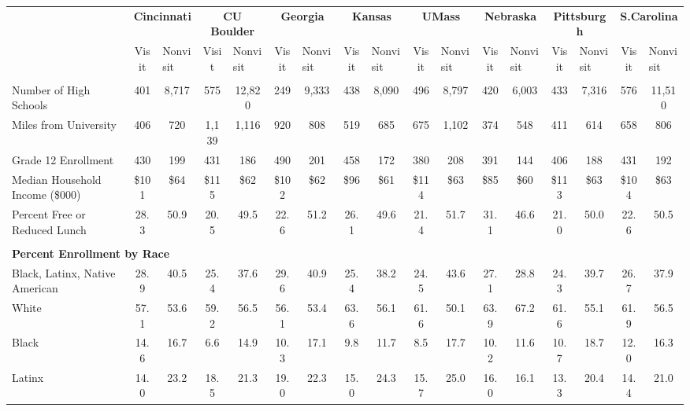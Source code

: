 \begin{tabular*}{\linewidth}{@{\extracolsep{\fill} } lcccccccccccccccc}%
&\multicolumn{2}{c}{\bfseries Cincinnati}&\multicolumn{2}{c}{\bfseries CU Boulder}&\multicolumn{2}{c}{\bfseries Georgia}&\multicolumn{2}{c}{\bfseries Kansas}&\multicolumn{2}{c}{\bfseries UMass}&\multicolumn{2}{c}{\bfseries Nebraska}&\multicolumn{2}{c}{\bfseries Pittsburgh}&\multicolumn{2}{c}{\bfseries S.Carolina}\\%
&Visit&\multicolumn{1}{l}{Nonvisit}&Visit&\multicolumn{1}{l}{Nonvisit}&Visit&\multicolumn{1}{l}{Nonvisit}&Visit&\multicolumn{1}{l}{Nonvisit}&Visit&\multicolumn{1}{l}{Nonvisit}&Visit&\multicolumn{1}{l}{Nonvisit}&Visit&\multicolumn{1}{l}{Nonvisit}&Visit&\multicolumn{1}{l}{Nonvisit}\\%
\hline%
&&&&&&&&&&&&&&&&\\%
\hspace{0cm}Number of High Schools&401&8,717&575&12,820&249&9,333&438&8,090&496&8,797&420&6,003&433&7,316&576&11,510\\%
\hspace{0cm}Miles from University&406&720&1,139&1,116&920&808&519&685&675&1,102&374&548&411&614&658&806\\%
\hspace{0cm}Grade 12 Enrollment&430&199&431&186&490&201&458&172&380&208&391&144&406&188&431&192\\%
\hspace{0cm}Median Household Income (\$000)&\$101&\$64&\$115&\$62&\$102&\$62&\$96&\$61&\$114&\$63&\$85&\$60&\$113&\$63&\$104&\$63\\%
\hspace{0cm}Percent Free or Reduced Lunch&28.3&50.9&20.5&49.5&22.6&51.2&26.1&49.6&21.4&51.7&31.1&46.6&21.0&50.0&22.6&50.5\\%
&&&&&&&&&&&&&&&&\\%
\multicolumn{17}{l}{\bfseries Percent Enrollment by Race}\\%
\hspace{0.2cm}Black, Latinx, Native American&28.9&40.5&25.4&37.6&29.6&40.9&25.4&38.2&24.5&43.6&27.1&28.8&24.3&39.7&26.7&37.9\\%
\hspace{0.2cm}White&57.1&53.6&59.2&56.5&56.1&53.4&63.6&56.1&61.6&50.1&63.9&67.2&61.6&55.1&61.9&56.5\\%
\hspace{0.2cm}Black&14.6&16.7&6.6&14.9&10.3&17.1&9.8&11.7&8.5&17.7&10.2&11.6&10.7&18.7&12.0&16.3\\%
\hspace{0.2cm}Latinx&14.0&23.2&18.5&21.3&19.0&22.3&15.0&24.3&15.7&25.0&16.0&16.1&13.3&20.4&14.4&21.0\\%

\end{tabular*}

